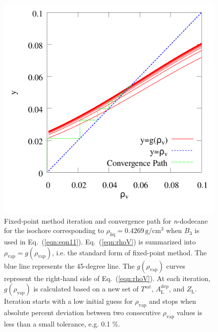 \documentclass[5p,times]{elsarticle}
\begin{document}
\begin{figure} 
\includegraphics[scale=0.25]{Figures/NIST-VAL_FTT_C12_conv_0_42690.png}
\caption{Fixed-point method iteration and convergence path for \textit{n}-dodecane for the isochore corresponding to $\rho_{\mathrm{liq}}=0.4269\,\mathrm{g/cm^3}$ when $B_3$ is used in Eq.~(\ref{eqn:eqn11}). Eq.~(\ref{eqn:rhoV}) is summarized into $\rho_{\mathrm{vap}}=g(\rho_{\mathrm{vap}})$, i.e. the standard form of fixed-point method. The blue line represents the 45-degree line. The $g(\rho_{\mathrm{vap}})$ curves represent the right-hand side of Eq.~(\ref{eqn:rhoV}). At each iteration, $g(\rho_{\mathrm{vap}})$ is calculated based on a new set of $T^{\mathrm{sat}}$, $A^{\mathrm{dep}}_{\mathrm{L}}$, and $Z_{\mathrm{L}}$. Iteration starts with a low initial guess for $\rho_{\mathrm{vap}}$ and stops when absolute percent deviation between two consecutive $\rho_{\mathrm{vap}}$ values is less than a small tolerance, e.g. 0.1 \%.}
\label{fig:NIST-VALIDATION/C12/FTT/0_42690_rhov}
\end{figure}
\end{document}
